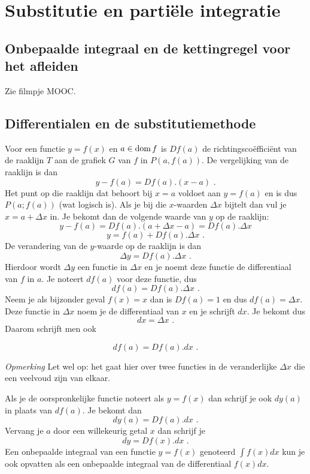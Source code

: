 \section{Substitutie en parti\"ele integratie}

\subsection{Onbepaalde integraal en de kettingregel voor het afleiden}
Zie filmpje MOOC.

\subsection{Differentialen en de substitutiemethode}

Voor een functie $y=f(x)$ en $a \in \operatorname{dom} f$ is $Df(a)$ de richtingsco\"effici\"ent van de raaklijn $T$ aan de grafiek $G$ van $f$ in $P(a,f(a))$.
De vergelijking van de raaklijn is dan
\[
y-f(a)=Df(a).(x-a) \text { .}
\]
Het punt op die raaklijn dat behoort bij $x=a$ voldoet aan $y=f(a)$ en is dus $P(a;f(a))$ (wat logisch is).
Als je bij die $x$-waarden $\Delta x$ bijtelt dan vul je $x=a+\Delta x$ in.
Je bekomt dan de volgende waarde van $y$ op de raaklijn:
\[
y-f(a)=Df(a).(a+\Delta x -a)=Df(a).\Delta x
\]
\[
y=f(a)+Df(a).\Delta x \text { .}
\]
De verandering van de $y$-waarde op de raaklijn is dan
\[
\Delta y=Df(a).\Delta x \text { .}
\]
Hierdoor wordt $\Delta y$ een functie in $\Delta x$ en je noemt deze functie de differentiaal van $f$ in $a$.
Je noteert  $df(a)$ voor deze functie, dus
\[
df(a)=Df(a).\Delta x \text { .}
\]
Neem je als bijzonder geval $f(x)=x$ dan is $Df(a)=1$ en dus $df(a)=\Delta x$.
Deze functie in $\Delta x$ noem je de differentiaal van $x$ en je schrijft $dx$.
Je bekomt dus
\[
dx=\Delta x \text { .}
\]
Daarom schrijft men ook
\begin{definitie}
	\[
df(a)=Df(a).dx \text { .}
\]
\end{definitie}

\emph{Opmerking}
Let wel op: het gaat hier over twee functies in de veranderlijke $\Delta x$ die een veelvoud zijn van elkaar.

Als je de oorspronkelijke functie noteert als $y=f(x)$ dan schrijf je ook $dy(a)$ in plaats van $df(a)$.
Je bekomt dan
\[
dy(a)=Df(a).dx \text { .}
\]
Vervang je $a$ door een willekeurig getal $x$ dan schrijf je
\[
dy=Df(x).dx \text { .}
\]
Een onbepaalde integraal van een functie $y=f(x)$ genoteerd $\int f(x)dx$ kun je ook opvatten als een onbepaalde integraal van de differentiaal $f(x)dx$.\\

